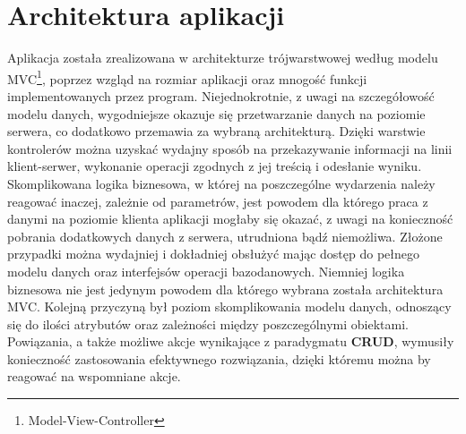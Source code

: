 	\section{Architektura aplikacji}
		Aplikacja została zrealizowana w architekturze trójwarstwowej według modelu MVC\footnote{Model-View-Controller}, poprzez wzgląd na rozmiar aplikacji oraz mnogość funkcji implementowanych przez program. Niejednokrotnie, z uwagi na szczegółowość modelu danych, wygodniejsze okazuje się przetwarzanie danych na poziomie serwera, co dodatkowo przemawia za wybraną architekturą. Dzięki warstwie kontrolerów można uzyskać wydajny sposób na przekazywanie informacji na linii klient-serwer, wykonanie operacji zgodnych z jej treścią i odesłanie wyniku. Skomplikowana logika biznesowa, w której na poszczególne wydarzenia należy reagować inaczej, zależnie od parametrów, jest powodem dla którego praca z danymi na poziomie klienta aplikacji mogłaby się okazać, z uwagi na konieczność pobrania dodatkowych danych z serwera, utrudniona bądź niemożliwa. Złożone przypadki można wydajniej i dokładniej obsłużyć mając dostęp do pełnego modelu danych oraz interfejsów operacji bazodanowych. Niemniej logika biznesowa nie jest jedynym powodem dla którego wybrana została architektura MVC. Kolejną przyczyną był poziom skomplikowania modelu danych, odnoszący się do ilości atrybutów oraz zależności między poszczególnymi obiektami. Powiązania, a także możliwe akcje wynikające z paradygmatu \textbf{CRUD}, wymusiły konieczność zastosowania efektywnego rozwiązania, dzięki któremu można by reagować na wspomniane akcje. 
